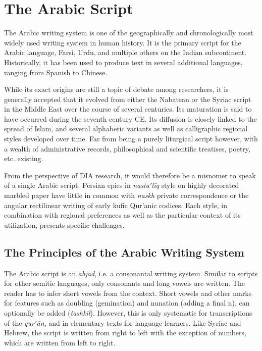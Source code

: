 \chapter{The Arabic Script}
\label{ch:arabic}
\thispagestyle{empty}
\newpage
{}

The Arabic writing system is one of the geographically and chronologically most
widely used writing system in human history. It is the primary script for the
Arabic language, Farsi, Urdu, and multiple others on the Indian subcontinent.
Historically, it has been used to produce text in several additional languages,
ranging from Spanish to Chinese.

While its exact origins are still a topic of debate among researchers, it is
generally accepted that it evolved from either the Nabatean or the Syriac
script in the Middle East over the course of several centuries. Its maturation
is said to have occurred during the seventh century CE. Its diffusion is
closely linked to the spread of Islam, and several alphabetic variants as well
as calligraphic regional styles developed over time. Far from being a purely
liturgical script however, with a wealth of administrative records,
philosophical and scientific treatises, poetry, etc. existing.

From the perspective of DIA research, it would therefore be a misnomer to speak
of a single Arabic script. Persian epics in \emph{nastaʼlīq} style on highly
decorated marbled paper have little in common with \emph{naskh} private
correspondence or the angular rectilinear writing of early kufic Qur’anic 
codices. Each style, in combination with regional preferences as well as the
particular context of its utilization, presents specific challenges.

\section{The Principles of the Arabic Writing System}

The Arabic script is an \emph{abjad}, i.e. a consonantal writing system.
Similar to scripts for other semitic languages, only consonants and long vowels
are written. The reader has to infer short vowels from the context. Short
vowels and other marks for features such as doubling (gemination) and nunation
(adding a final n), can optionally be added (\emph{tashkīl}).
However, this is only systematic for transcriptions of the \emph{qurʼān}, and in
elementary texts for language learners. Like Syriac and Hebrew, the script is
written from right to left with the exception of numbers, which are written
from left to right.

